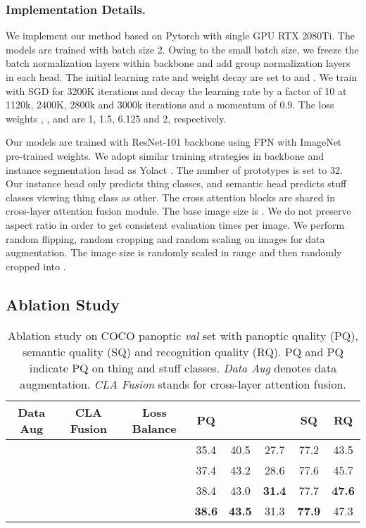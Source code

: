 \documentclass[runningheads]{llncs}
\begin{document}
\subsubsection{Implementation Details.}
We implement our method based on Pytorch \cite{Paszke2019} with single GPU RTX 2080Ti. The models are trained with batch size 2. Owing to the small batch size, we freeze the batch normalization layers within backbone and add group normalization \cite{Wu2018} layers in each head. The initial learning rate and weight decay are set to  and . We train with SGD for 3200K iterations and decay the learning rate by a factor of 10 at 1120k, 2400K, 2800k and 3000k iterations and a momentum of 0.9. The loss weights , ,  and  are 1, 1.5, 6.125 and 2, respectively.

Our models are trained with ResNet-101 \cite{He2016} backbone using FPN with ImageNet \cite{Russakovsky2015} pre-trained weights. We adopt similar training strategies in backbone and instance segmentation head as Yolact \cite{Bolya}. The number of prototypes  is set to 32. Our instance head only predicts thing classes, and semantic head predicts stuff classes viewing thing class as other. The cross attention blocks are shared in cross-layer attention fusion module. The base image size is . We do not preserve aspect ratio in order to get consistent evaluation times per image. We perform random flipping, random cropping and random scaling on images for data augmentation. The image size is randomly scaled in range  and then randomly cropped into . 


\subsection{Ablation Study}

\begin{table}[!tb]
\centering
\caption{Ablation study on COCO panoptic \emph{val} set with panoptic quality (PQ), semantic quality (SQ) and recognition quality  (RQ). PQ and PQ indicate PQ on thing and stuff classes. \emph{Data Aug} denotes data augmentation. \emph{CLA Fusion} stands for cross-layer attention fusion. }
\begin{tabular}{c c c | c c c c c}
\hline
Data Aug & CLA Fusion & Loss Balance &PQ                   &  &  &  SQ &  RQ  \\ \hline \hline
                &               &               & 35.4 & 40.5 & 27.7 & 77.2 & 43.5  \\ \hline
        &               &               & 37.4 & 43.2 & 28.6 & 77.6 & 45.7  \\ \hline
        &       &               & 38.4 & 43.0 & \textbf{31.4} & 77.7 & \textbf{47.6}  \\ \hline
        &       &       & \textbf{38.6} & \textbf{43.5} & 31.3 & \textbf{77.9} & 47.3  \\ \hline

\end{tabular}
\label{table:ablation}
\end{table}
\end{document}
